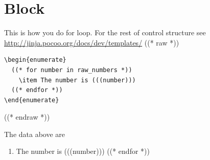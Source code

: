 \documentclass[12pt]{article}
\begin{document}
\section{Block}

This is how you do for loop. For the rest of control structure see \url{http://jinja.pocoo.org/docs/dev/templates/}
((* raw *))
\begin{verbatim}
\begin{enumerate}
  ((* for number in raw_numbers *))
    \item The number is (((number)))
  ((* endfor *))
\end{enumerate}
\end{verbatim}
((* endraw *))

The data above are
\begin{enumerate}
  ((* for number in raw_numbers *))
    \item The number is (((number)))
  ((* endfor *))
\end{enumerate}
\end{document}

